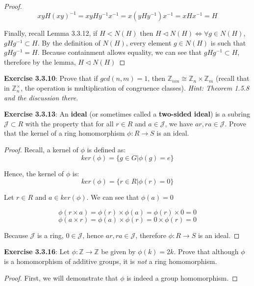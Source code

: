 \documentclass[a4paper]{article}
\begin{document}
\begin{myparindent}{0pt}
\begin{proof}
  \[ x y H (x y)^{-1} = xy H y^{-1} x^{-1} = x(y H y^{-1}) x^{-1} = x H x^{-1} = H \]

  Finally, recall Lemma 3.3.12, if $H < N(H)$ then
  $H \triangleleft N(H) \iff \forall g \in N(H)$, $gHg^{-1} \subset H$.
  By the definition of $N(H)$, every element $g \in N(H)$ is such that $gHg^{-1} = H$.
  Because containment allows equality, we can see that $gHg^{-1} \subset H$,
  therefore by the lemma, $H \triangleleft N(H)$
\end{proof}

\textbf{Exercise 3.3.10}:
Prove that if $gcd(n, m) = 1$, then
$\mathbb{Z}_{nm} \cong \mathbb{Z}_n \times \mathbb{Z}_m$
(recall that in $\mathbb{Z}_n^\times$, the operation is multiplication of
congruence classes). \textit{Hint: Theorem 1.5.8 and the discussion there}.
\newline

\textbf{Exercise 3.3.13}:
An \textbf{ideal} (or sometimes called a \textbf{two-sided ideal}) is a
subring $\mathcal{J} \subset R$ with the property that for all
$r \in R$ and $a \in \mathcal{J}$, we have $ar, ra \in \mathcal{J}$.
Prove that the kernel of a ring homomorphism $\phi: R \rightarrow S$ is an ideal.
\newline

\begin{proof}
  Recall, a kernel of $\phi$ is defined as:
  \[ ker(\phi) = \{ g \in G | \phi(g) = e \} \]

  Hence, the kernel of $\phi$ is:
  \[ ker(\phi) = \{ r \in R | \phi(r) = 0 \} \]

  Let $r \in R$ and $a \in ker(\phi)$. We can see that $\phi(a) = 0$

  \[ \phi(r \times a) = \phi(r) \times \phi(a) = \phi(r) \times 0 = 0 \]
  \[ \phi(a \times r) = \phi(a) \times \phi(r) = 0 \times \phi(r) = 0 \]

  Because $\mathcal{J}$ is a ring, $0 \in \mathcal{J}$, hence $ar, ra \in \mathcal{J}$,
  therefore $\phi: R \rightarrow S$ is an ideal.
\end{proof}

\textbf{Exercise 3.3.16}:
Let $\phi: \mathbb{Z} \rightarrow \mathbb{Z}$ be given by $\phi(k) = 2k$. Prove
that although $\phi$ is a homomorphism of additive groups, it is \textit{not}
a ring homomorphism.

\begin{proof}
  First, we will demonstrate that $\phi$ is indeed a group homomorphism. \newline


\end{proof}
\end{myparindent}
\end{document}
